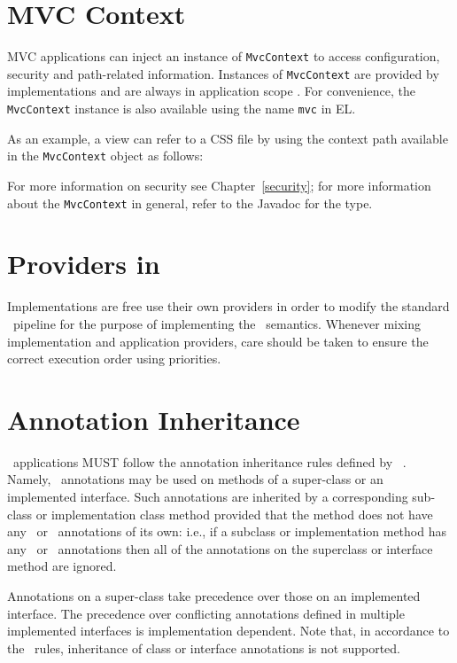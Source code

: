 \section{MVC Context}
\label{mvc_context}

MVC applications can inject an instance of {\tt MvcContext} to access configuration,
security and path-related information. Instances of {\tt MvcContext} are provided
by implementations and are always in application scope . 
For convenience, the
{\tt MvcContext} instance is also available using the name {\tt mvc} in EL.

As an example, a view can refer to a CSS file by using the context path available in 
the {\tt MvcContext} object as follows:



For more information on security see Chapter~\ref{security}; for more information 
about the {\tt MvcContext} in general, refer to the Javadoc for the type.

\section{Providers in \mvc}
\label{providers_in_mvc}

Implementations are free use their own providers in order to modify the standard 
\jaxrs\ pipeline for the purpose of implementing the \mvc\ semantics. Whenever mixing 
implementation and application providers, care should be taken to ensure the correct 
execution order using priorities.

\section{Annotation Inheritance}
\label{annotation_inheritance}

\mvc\  applications MUST follow the annotation inheritance rules defined by \jaxrs\ 
. Namely, \mvc\ annotations may be used on methods of a 
super-class or an implemented interface. Such annotations are inherited 
by a corresponding sub-class or implementation class method provided that the method does 
not have any \mvc\ or \jaxrs\ annotations of its own: 
i.e., if a subclass or implementation method has any \mvc\ or \jaxrs\ annotations then all of the
annotations on the superclass or interface method are ignored.

Annotations on a super-class take precedence over those on an implemented interface. The
precedence over conflicting annotations defined in multiple implemented interfaces is implementation dependent.
Note that, in accordance to the \jaxrs\ rules, inheritance of class or interface annotations 
is not supported. 

